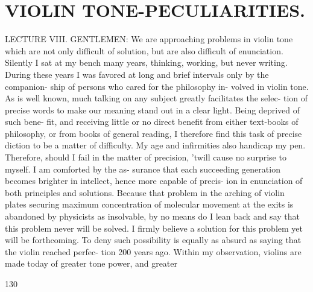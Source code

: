 \documentclass{article}
\begin{document}
\section*{VIOLIN TONE-PECULIARITIES.}
LECTURE VIII. GENTLEMEN: We are approaching problems in violin tone which are not only difficult of solution, but are also difficult of enunciation. Silently I sat at my bench many years, thinking, working, but never writing. During these years I was favored at long and brief intervals only by the companion- ship of persons who cared for the philosophy in- volved in violin tone. As is well known, much talking on any subject greatly facilitates the selec- tion of precise words to make our meaning stand out in a clear light. Being deprived of such bene- fit, and receiving little or no direct benefit from either text-books of philosophy, or from books of general reading, I therefore find this task of precise diction to be a matter of difficulty. My age and infirmities also handicap my pen. Therefore, should I fail in the matter of precision, 'twill cause no surprise to myself. I am comforted by the as- surance that each succeeding generation becomes brighter in intellect, hence more capable of precis- ion in enunciation of both principles and solutions. Because that problem in the arching of violin plates securing maximum concentration of molecular movement at the exits is abandoned by physicists as insolvable, by no means do I lean back and say that this problem never will be solved. I firmly believe a solution for this problem yet will be forthcoming. To deny such possibility is equally as absurd as saying that the violin reached perfec- tion 200 years ago. Within my observation, violins are made today of greater tone power, and greater

130
\end{document}
